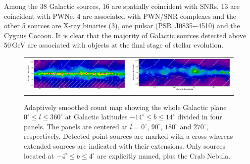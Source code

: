 Among the 38 Galactic sources, 16 are spatially coincident with SNRs, 13 are coincident with PWNe, 4 are associated with PWN/SNR complexes
and the other 5 sources are X-ray binaries (3), one pulsar (PSR~J0835$-$4510)
and the Cygnus Cocoon.
It is clear that the majority of Galactic sources detected above 50\,GeV
are associated with objects at the final stage of stellar evolution.

\begin{figure}[!ht]
	\begin{center}
		\begin{tabular}{ll}
			        \includegraphics[angle=90,scale=.3]{Figures/Galactic_plane_CAR_1of4_sqrt_spectral_2FHL.eps}&
			        \includegraphics[angle=90,scale=.3]{Figures/Galactic_plane_CAR_2of4_sqrt_spectral_2FHL.eps}\\
			
			
		\end{tabular}
	\end{center}
	\caption{Adaptively smoothed count map showing the whole Galactic plane $0^{\circ}\leq l\leq 360^{\circ}$ at Galactic latitudes $-14^{\circ} \leq b\leq 14^{\circ}$ divided in four  panels. The panels are centered at $l=0^{\circ}$, $90^{\circ}$, $180^{\circ}$ and $270^{\circ}$, respectively. Detected point sources are marked with a cross whereas extended sources are indicated with  their extensions. Only sources located at $-4^{\circ} \leq b\leq 4^{\circ}$ are explicitly named, plus the Crab Nebula.
		\label{fig:gp1}}
\end{figure}


